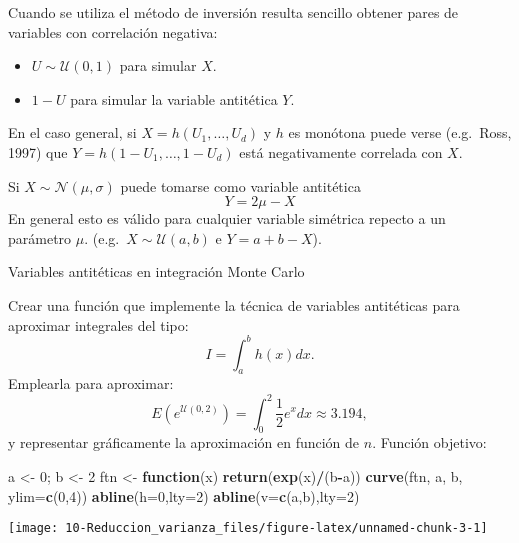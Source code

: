 \documentclass[
]{book}
\newenvironment{Shaded}{\begin{snugshade}}{\end{snugshade}}
\newcommand{\ControlFlowTok}[1]{\textcolor[rgb]{0.13,0.29,0.53}{\textbf{#1}}}
\newcommand{\DataTypeTok}[1]{\textcolor[rgb]{0.13,0.29,0.53}{#1}}
\newcommand{\DecValTok}[1]{\textcolor[rgb]{0.00,0.00,0.81}{#1}}
\newcommand{\KeywordTok}[1]{\textcolor[rgb]{0.13,0.29,0.53}{\textbf{#1}}}
\newcommand{\NormalTok}[1]{#1}
\newcommand{\OperatorTok}[1]{\textcolor[rgb]{0.81,0.36,0.00}{\textbf{#1}}}
\newcommand{\StringTok}[1]{\textcolor[rgb]{0.31,0.60,0.02}{#1}}
\theoremstyle{break}
\theoremstyle{definition}
\theoremstyle{definition}
\theoremstyle{definition}
\theoremstyle{remark}
\let\BeginKnitrBlock\begin \let\EndKnitrBlock\end
\begin{document}
Cuando se utiliza el método de inversión resulta sencillo obtener
pares de variables con correlación negativa:

\begin{itemize}
\item
  \(U\sim \mathcal{U}\left( 0,1\right)\) para simular \(X\).
\item
  \(1-U\) para simular la variable antitética \(Y\).
\end{itemize}

En el caso general, si \(X=h\left( U_{1},\ldots,U_{d}\right)\) y
\(h\) es monótona puede verse (e.g.~Ross, 1997) que
\(Y=h\left( 1-U_{1},\ldots,1-U_{d}\right)\) está negativamente
correlada con \(X\).

Si \(X\sim \mathcal{N}(\mu,\sigma)\) puede tomarse como variable
antitética \[Y=2\mu-X\]
En general esto es válido para cualquier variable
simétrica repecto a un parámetro \(\mu\).
(e.g.~\(X\sim \mathcal{U}(a,b)\) e \(Y=a+b-X\)).

\BeginKnitrBlock{exercise}
\protect\hypertarget{exr:unnamed-chunk-2}{}{\label{exr:unnamed-chunk-2} }Variables antitéticas en integración Monte Carlo
\EndKnitrBlock{exercise}

Crear una función que implemente la técnica de variables antitéticas
para aproximar integrales del
tipo:\[I=\int_{a}^{b}h\left(  x\right)  dx.\] Emplearla para
aproximar:
\[E\left(  e^{\mathcal{U}(0,2)}\right)  =\int_{0}^{2}\frac{1}{2}e^{x}dx\approx3.194,\label{integralmc}\]
y representar gráficamente la aproximación en función de \(n\).
Función objetivo:

\begin{Shaded}
\begin{Highlighting}[]
\NormalTok{a <-}\StringTok{ }\DecValTok{0}\NormalTok{; b <-}\StringTok{ }\DecValTok{2}
\NormalTok{ftn <-}\StringTok{ }\ControlFlowTok{function}\NormalTok{(x) }\KeywordTok{return}\NormalTok{(}\KeywordTok{exp}\NormalTok{(x)}\OperatorTok{/}\NormalTok{(b}\OperatorTok{-}\NormalTok{a))}
\KeywordTok{curve}\NormalTok{(ftn, a, b, }\DataTypeTok{ylim=}\KeywordTok{c}\NormalTok{(}\DecValTok{0}\NormalTok{,}\DecValTok{4}\NormalTok{))}
\KeywordTok{abline}\NormalTok{(}\DataTypeTok{h=}\DecValTok{0}\NormalTok{,}\DataTypeTok{lty=}\DecValTok{2}\NormalTok{)}
\KeywordTok{abline}\NormalTok{(}\DataTypeTok{v=}\KeywordTok{c}\NormalTok{(a,b),}\DataTypeTok{lty=}\DecValTok{2}\NormalTok{)}
\end{Highlighting}
\end{Shaded}

\begin{center}\texttt{[image: 10-Reduccion\_varianza\_files/figure-latex/unnamed-chunk-3-1]} \end{center}
\end{document}
